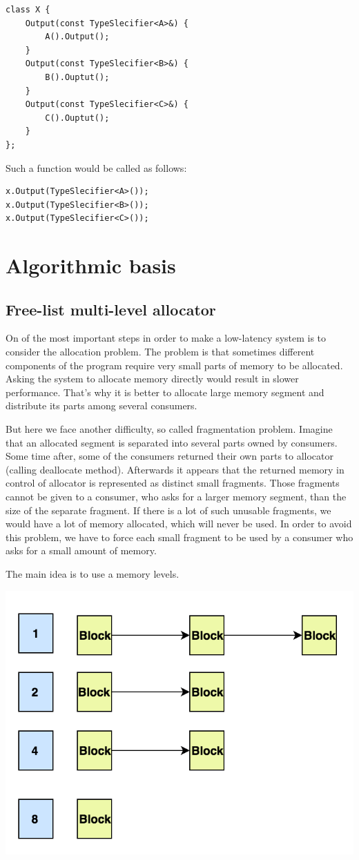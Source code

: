 \documentclass{article}
\begin{document}
\begin{lstlisting}
class X {
	Output(const TypeSlecifier<A>&) {
		A().Output();
	}
	Output(const TypeSlecifier<B>&) {
		B().Ouptut();
	}
	Output(const TypeSlecifier<C>&) {
		C().Ouptut();
	}
};
\end{lstlisting}
Such a function would be called as follows:

\begin{lstlisting}
x.Output(TypeSlecifier<A>());
x.Output(TypeSlecifier<B>());
x.Output(TypeSlecifier<C>());
\end{lstlisting}


\section{Algorithmic basis}

\subsection{Free-list multi-level allocator}
\label{free_list_algo}

On of the most important steps in order to make a low-latency system is to consider the allocation problem. The problem is that sometimes different components of the program require very small parts of memory to be allocated. Asking the system to allocate memory directly would result in slower performance. That's why it is better to allocate large memory segment and distribute its parts among several consumers.

But here we face another difficulty, so called fragmentation problem. Imagine that an allocated segment is separated into several parts owned by consumers. Some time after, some of the consumers returned their own parts to allocator (calling deallocate method). Afterwards it appears that the returned memory in control of allocator is represented as distinct small fragments. Those fragments cannot be given to a consumer, who asks for a larger memory segment, than the size of the separate fragment. If there is a lot of such unusable fragments, we would have a lot of memory allocated, which will never be used. In order to avoid this problem, we have to force each small fragment to be used by a consumer who asks for a small amount of memory.

The main idea is to use a memory levels.

\begin{center}\includegraphics[width=0.5 \textwidth]{image1.png}\end{center}
\end{document}
